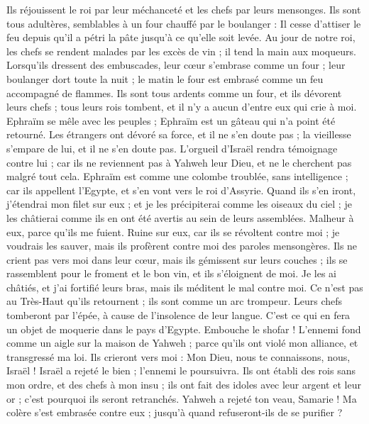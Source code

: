 \begin{multicols}{2}
Ils réjouissent le roi par leur méchanceté et les chefs par leurs mensonges.
Ils sont tous adultères, semblables à un four chauffé par le boulanger : Il cesse d’attiser le feu depuis qu’il a pétri la pâte jusqu'à ce qu'elle soit levée.
Au jour de notre roi, les chefs se rendent malades par les excès de vin ; il tend la main aux moqueurs.
Lorsqu’ils dressent des embuscades, leur cœur s’embrase comme un four ; leur boulanger dort toute la nuit ; le matin le four est embrasé comme un feu accompagné de flammes.
Ils sont tous ardents comme un four, et ils dévorent leurs chefs ; tous leurs rois tombent, et il n'y a aucun d'entre eux qui crie à moi.
Ephraïm se mêle avec les peuples ; Ephraïm est un gâteau qui n'a point été retourné.
Les étrangers ont dévoré sa force, et il ne s’en doute pas ; la vieillesse s’empare de lui, et il ne s’en doute pas.
L'orgueil d'Israël rendra témoignage contre lui ; car ils ne reviennent pas à Yahweh leur Dieu, et ne le cherchent pas malgré tout cela.
Ephraïm est comme une colombe troublée, sans intelligence ; car ils appellent l'Egypte, et s’en vont vers le roi d'Assyrie.
Quand ils s’en iront, j'étendrai mon filet sur eux ; et je les précipiterai comme les oiseaux du ciel ; je les châtierai comme ils en ont été avertis au sein de leurs assemblées.
Malheur à eux, parce qu'ils me fuient. Ruine sur eux, car ils se révoltent contre moi ; je voudrais les sauver, mais ils profèrent contre moi des paroles mensongères.
Ils ne crient pas vers moi dans leur cœur, mais ils gémissent sur leurs couches ; ils se rassemblent pour le froment et le bon vin, et ils s’éloignent de moi.
Je les ai châtiés, et j'ai fortifié leurs bras, mais ils méditent le mal contre moi.
Ce n’est pas au Très-Haut qu’ils retournent ; ils sont comme un arc trompeur. Leurs chefs tomberont par l’épée, à cause de l’insolence de leur langue. C’est ce qui en fera un objet de moquerie dans le pays d'Egypte.
\VerseOne{}Embouche le shofar ! L’ennemi fond comme un aigle sur la maison de Yahweh ; parce qu'ils ont violé mon alliance, et transgressé ma loi.
Ils crieront vers moi : Mon Dieu, nous te connaissons, nous, Israël !
Israël a rejeté le bien ; l'ennemi le poursuivra.
Ils ont établi des rois sans mon ordre, et des chefs à mon insu ; ils ont fait des idoles avec leur argent et leur or ; c'est pourquoi ils seront retranchés.
Yahweh a rejeté ton veau, Samarie ! Ma colère s'est embrasée contre eux ; jusqu'à quand refuseront-ils de se purifier ?

\end{multicols}
